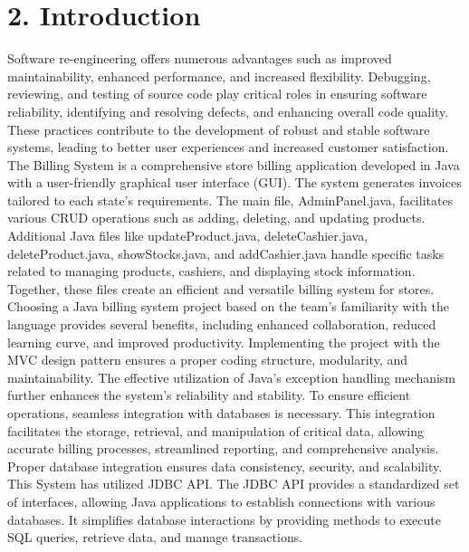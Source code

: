 \documentclass[12pt,letterpaper]{report}
\begin{document}
\section*{2. Introduction}
\normalsize {
Software re-engineering offers numerous advantages such as improved maintainability, enhanced performance, and increased flexibility. Debugging, reviewing, and testing of source code play critical roles in ensuring software reliability, identifying and resolving defects, and enhancing overall code quality. These practices contribute to the development of robust and stable software systems, leading to better user experiences and increased customer satisfaction.\\

The Billing System is a comprehensive store billing application developed in Java with a user-friendly graphical user interface (GUI). The system generates invoices tailored to each state's requirements. The main file, AdminPanel.java, facilitates various CRUD operations such as adding, deleting, and updating products. Additional Java files like updateProduct.java, deleteCashier.java, deleteProduct.java, showStocks.java, and addCashier.java handle specific tasks related to managing products, cashiers, and displaying stock information. Together, these files create an efficient and versatile billing system for stores. \\  

Choosing a Java billing system project based on the team's familiarity with the language provides several benefits, including enhanced collaboration, reduced learning curve, and improved productivity. Implementing the project with the MVC design pattern ensures a proper coding structure, modularity, and maintainability. The effective utilization of Java's exception handling mechanism further enhances the system's reliability and stability. To ensure efficient operations, seamless integration with databases is necessary. This integration facilitates the storage, retrieval, and manipulation of critical data, allowing accurate billing processes, streamlined reporting, and comprehensive analysis. Proper database integration ensures data consistency, security, and scalability. This System has utilized JDBC API. The JDBC API provides a standardized set of interfaces, allowing Java applications to establish connections with various databases. It simplifies database interactions by providing methods to execute SQL queries, retrieve data, and manage transactions.
}
\end{document}
